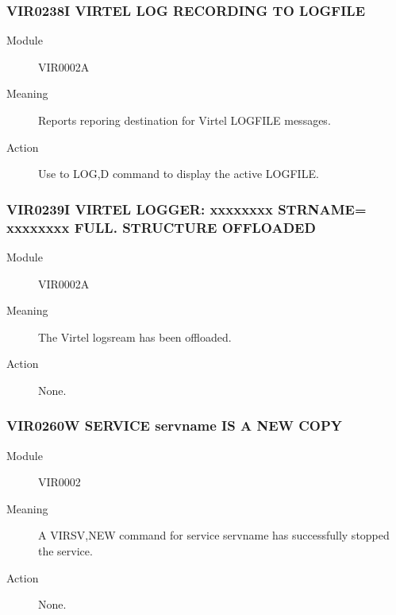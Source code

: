 \documentclass[letterpaper,10pt,english]{sphinxmanual}
\begin{document}
\subsubsection{VIR0238I VIRTEL LOG RECORDING TO LOGFILE}
\label{\detokenize{messages:vir0238i-virtel-log-recording-to-logfile}}\begin{description}
\item[{Module}] \leavevmode
VIR0002A

\item[{Meaning}] \leavevmode
Reports reporing destination for Virtel LOGFILE messages.

\item[{Action}] \leavevmode
Use to LOG,D command to display the active LOGFILE.

\end{description}


\subsubsection{VIR0239I VIRTEL LOGGER: xxxxxxxx STRNAME= xxxxxxxx FULL. STRUCTURE OFFLOADED}
\label{\detokenize{messages:vir0239i-virtel-logger-xxxxxxxx-strname-xxxxxxxx-full-structure-offloaded}}\begin{description}
\item[{Module}] \leavevmode
VIR0002A

\item[{Meaning}] \leavevmode
The Virtel logsream has been offloaded.

\item[{Action}] \leavevmode
None.

\end{description}


\subsubsection{VIR0260W SERVICE servname IS A NEW COPY}
\label{\detokenize{messages:vir0260w-service-servname-is-a-new-copy}}\begin{description}
\item[{Module}] \leavevmode
VIR0002

\item[{Meaning}] \leavevmode
A VIRSV,NEW command for service servname has successfully stopped the service.

\item[{Action}] \leavevmode
None.

\end{description}
\end{document}
